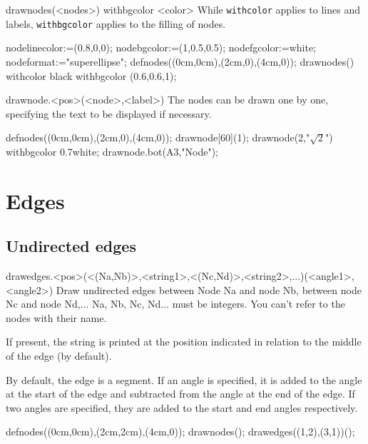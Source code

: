 \documentclass[11pt,a4paper,english]{article}
\begin{document}
\begin{rpdeclaration}{drawnodes(<nodes>) withbgcolor <color>}
While \verb|withcolor| applies to lines and labels, \verb|withbgcolor| applies to the filling of nodes.
\end{rpdeclaration}

\begin{exemple}[lefthand ratio = 0.63]
nodelinecolor:=(0.8,0,0);
nodebgcolor:=(1,0.5,0.5);
nodefgcolor:=white;
nodeformat:="superellipse";
defnodes((0cm,0cm),(2cm,0),(4cm,0));
drawnodes() withcolor black withbgcolor (0.6,0.6,1);
\end{exemple}


\begin{rplabel}{drawnode.<pos>(<node>,<label>)}
The nodes can be drawn one by one, specifying the text to be displayed if necessary.
\end{rplabel}

\begin{exemple}[lefthand ratio = 0.6]
defnodes((0cm,0cm),(2cm,0),(4cm,0));
drawnode[60](1);
drawnode(2,"$\sqrt{2}$") withbgcolor 0.7white;
drawnode.bot(A3,"Node");
\end{exemple}

\section{Edges}
\subsection{Undirected edges}

\begin{rplabel}{drawedges.<pos>(<(Na,Nb)>,<string1>,<(Nc,Nd)>,<string2>,...)(<angle1>,<angle2>)}
Draw undirected edges between Node Na and node Nb, between node Nc and node Nd,... Na, Nb, Nc, Nd... must be integers. You can't refer to the nodes with their name.

If present, the string is printed at the position indicated in relation to the middle of the edge (by default).

By default, the edge is a segment. If an angle is specified, it is added to the angle at the start of the edge and subtracted from the angle at the end of the edge. If two angles are specified, they are added to the start and end angles respectively.
\end{rplabel}


\begin{exemple}[lefthand ratio = 0.6]
defnodes((0cm,0cm),(2cm,2cm),(4cm,0));
drawnodes();
drawedges((1,2),(3,1))();
\end{exemple}
\end{document}
